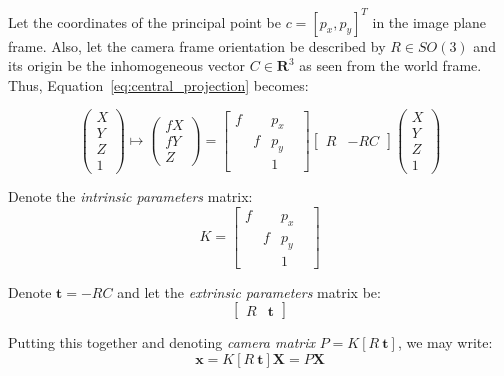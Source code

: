 \documentclass{bmvc2k}
\begin{document}
Let the coordinates of the principal point be $c = [p_x,p_y]^T$ in the
image plane frame. Also, let the camera frame orientation be described
by $R\in SO(3)$ and its origin be the inhomogeneous vector
$C\in \mathbf{R}^3$ as seen from the world frame. Thus,
Equation~\ref{eq:central_projection} becomes:

\begin{equation}\label{eq:central_projection1}
\begin{pmatrix}
X\\ Y\\ Z\\ 1
\end{pmatrix}
\mapsto
\begin{pmatrix}
fX\\ fY\\ Z
\end{pmatrix}
=
\begin{bmatrix}
f& &p_x& \\
 &f&p_y& \\
 & &1  &
\end{bmatrix}
\begin{bmatrix}
R & -RC
\end{bmatrix}
\begin{pmatrix}
X\\ Y\\ Z\\ 1
\end{pmatrix}
\end{equation}

Denote the \emph{intrinsic parameters} matrix:
\begin{equation}
\label{eq:intrinsic}
K=\begin{bmatrix} f & & p_x & \\ & f & p_y & \\ & & 1 & \end{bmatrix}
\end{equation}

Denote $\mathbf{t} = -RC$ and let the \emph{extrinsic parameters}
matrix be:
\begin{equation}
\begin{bmatrix}
R & \mathbf{t}
\end{bmatrix}
\end{equation}

Putting this together and denoting \emph{camera matrix}
$P=K[R\ \mathbf{t}]$, we may write:
\begin{equation}
\mathbf{x} = K[R\ \mathbf{t}]\mathbf{X} = P\mathbf{X}
\end{equation}
\end{document}
